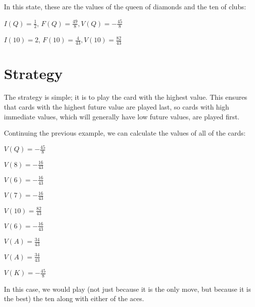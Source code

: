 \documentclass{article}
\begin{document}
In this state, these are the values of the queen of diamonds and the ten of clubs:

$I(Q) = \frac{1}{2}$, $F(Q) = \frac{49}{8}, V(Q) = -\frac{45}{8}$

$I(10) = 2$, $F(10) = \frac{4}{43}, V(10) = \frac{82}{43}$

\section{Strategy}

The strategy is simple; it is to play the card with the highest value. This ensures that cards with the highest future value are played last, so cards with high immediate values, which will generally have low future values, are played first.

Continuing the previous example, we can calculate the values of all of the cards:

$V(Q) = -\frac{45}{8}$

$V(8) = -\frac{16}{43}$

$V(6) = -\frac{16}{43}$

$V(7) = -\frac{16}{43}$

$V(10) = \frac{82}{43}$

$V(6) = -\frac{16}{43}$

$V(A) = \frac{34}{43}$

$V(A) = \frac{34}{43}$

$V(K) = -\frac{45}{8}$

In this case, we would play (not just because it is the only move, but because it is the best) the ten along with either of the aces.
\end{document}
